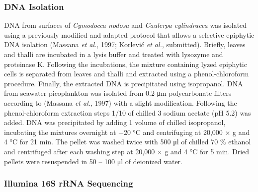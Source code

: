 \documentclass[12pt,]{article}
\begin{document}
\hypertarget{dna-isolation}{%
\subsubsection{DNA Isolation}\label{dna-isolation}}

DNA from surfaces of \emph{Cymodocea nodosa} and \emph{Caulerpa
cylindracea} was isolated using a previously modified and adapted
protocol that allows a selective epiphytic DNA isolation (Massana
\emph{et al.}, 1997; Korlević \emph{et al.}, submitted). Briefly, leaves
and thalli are incubated in a lysis buffer and treated with lysozyme and
proteinase K. Following the incubations, the mixture containing lyzed
epiphytic cells is separated from leaves and thalli and extracted using
a phenol-chloroform procedure. Finally, the extracted DNA is
precipitated using isopropanol. DNA from seawater picoplankton was
isolated from 0.2 \si{\um} polycarbonate filters according to (Massana
\emph{et al.}, 1997) with a slight modification. Following the
phenol-chloroform extraction steps 1/10 of chilled 3 \si{\Molar} sodium
acetate (pH 5.2) was added. DNA was precipitated by adding 1 volume of
chilled isopropanol, incubating the mixtures overnight at \num{-20}
\si{\degreeCelsius} and centrifuging at 20,000 × g and 4
\si{\degreeCelsius} for 21 \si{\minute}. The pellet was washed twice
with 500 \si{\ul} of chilled 70 \si{\percent} ethanol and centrifuged
after each washing step at 20,000 × g and 4 \si{\degreeCelsius} for 5
\si{\minute}. Dried pellets were resuspended in 50 -- 100 \si{\ul} of
deionized water.

\hypertarget{illumina-16s-rrna-sequencing}{%
\subsubsection{Illumina 16S rRNA
Sequencing}\label{illumina-16s-rrna-sequencing}}
\end{document}
